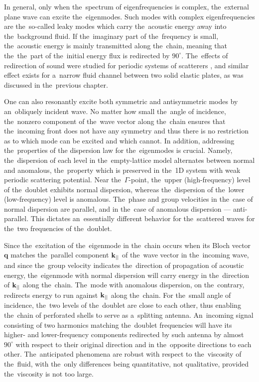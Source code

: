 In general, only when the~spectrum of eigenfrequencies is complex, the~external plane wave can excite the~eigenmodes.
Such modes with complex eigenfrequencies are the~so-called leaky modes which carry the~acoustic energy away into the~background fluid.
If the~imaginary part of the~frequency is small, the~acoustic energy is mainly transmitted along the~chain, meaning that the~the~part of the~initial energy flux is redirected by $90^{\circ}$.
The~effects of redirection of sound were studied for periodic systems of scatterers \cite{garcia1,norris1,deraa1}, and similar effect exists for a~narrow fluid channel between two solid elastic plates, as was discussed in the~previous chapter.

One can also resonantly excite both symmetric and antisymmetric modes by an~obliquely incident wave.
No matter how small the~angle of incidence, the~nonzero component of the~wave vector along the~chain ensures that the~incoming front does not have any symmetry and thus there is no restriction as to which mode can be excited and which cannot.
In addition, addressing the~properties of the dispersion law for the~eigenmodes is crucial.
Namely, the~dispersion of each level in the~empty-lattice model alternates between normal and anomalous, the~property which is preserved in the~1D system with weak periodic scattering potential.
Near the~$\Gamma$-point, the~upper (high-frequency) level of the~doublet exhibits normal dispersion, whereas the~dispersion of the~lower (low-frequency) level is anomalous.
The~phase and group velocities in the~case of normal dispersion are parallel, and in the~case of anomalous dispersion --- anti-parallel.
This dictates an~essentially different behavior for the~scattered waves for the~two frequencies of the~doublet.

Since the~excitation of the~eigenmode in the~chain occurs when its Bloch vector $\mathbf{q}$ matches the~parallel component $\bf k_{||}$ of the~wave vector in the~incoming wave, and since the~group velocity indicates the~direction of propagation of acoustic energy, the~eigenmode with normal dispersion will carry energy in the~direction of $\bf k_{||}$ along the~chain.
The~mode with anomalous dispersion, on the~contrary, redirects energy to run against $\bf k_{||}$ along the~chain.
For the~small angle of incidence, the~two levels of the~doublet are close to each other, thus enabling the~chain of perforated shells to serve as a~splitting antenna.
An~incoming signal consisting of two harmonics matching the~doublet frequencies will have its higher- and lower-frequency components redirected by such antenna by almost $90^{\circ}$ with respect to their original direction and in the~opposite directions to each other.
The~anticipated phenomena are robust with respect to the~viscosity of the~fluid, with the~only differences being quantitative, not qualitative, provided the~viscosity is not too large.

